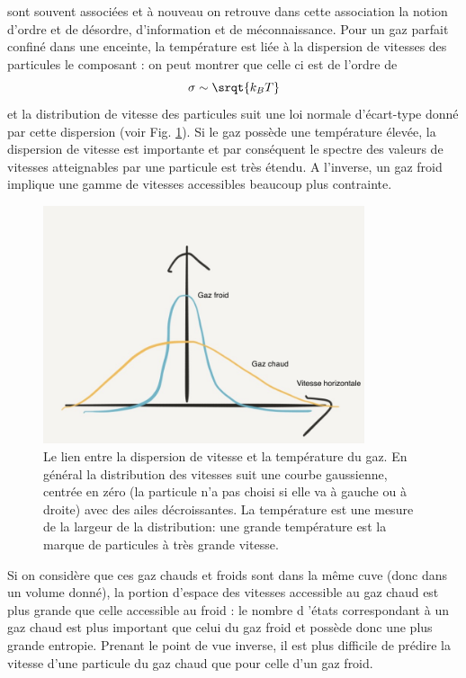  sont souvent associées et à nouveau on retrouve dans cette association la notion d'ordre et de désordre, d'information et de méconnaissance. Pour un gaz parfait confiné dans une enceinte, la température est liée à la dispersion de vitesses des particules le composant : on peut montrer que celle ci est de l'ordre de
\begin{equation}
\sigma \sim \srqt{k_B T}
\end{equation}
et la distribution de vitesse des particules suit une loi normale d'écart-type donné par cette dispersion (voir Fig. \ref{f:disp}). Si le gaz possède une température élevée, la dispersion de vitesse est importante et par conséquent le spectre des valeurs de vitesses atteignables par une particule est très étendu. A l'inverse, un gaz froid implique une gamme de vitesses accessibles beaucoup plus contrainte.
\begin{figure}[htbp]
	\centering
		\includegraphics[height=7cm]{figs/dispersion.png}
	\caption[Le lien entre la dispersion de vitesse et la température du gaz. ]{Le lien entre la dispersion de vitesse et la température du gaz. En général la distribution des vitesses suit une courbe gaussienne, centrée en zéro (la particule n'a pas choisi si elle va à gauche ou à droite) avec des ailes décroissantes. La température est une mesure de la largeur de la distribution: une grande température est la marque de particules à très grande vitesse.}
	\label{f:disp}
\end{figure}
Si on considère que ces gaz chauds et froids sont dans la même cuve (donc dans un volume donné), la portion d'espace des vitesses accessible au gaz chaud est plus grande que celle accessible au froid : le nombre d 'états correspondant à un gaz chaud est plus important que celui du gaz froid et possède donc une plus grande entropie. Prenant le point de vue inverse, il est plus difficile de prédire la vitesse d'une particule du gaz chaud que pour celle d'un gaz froid. 

